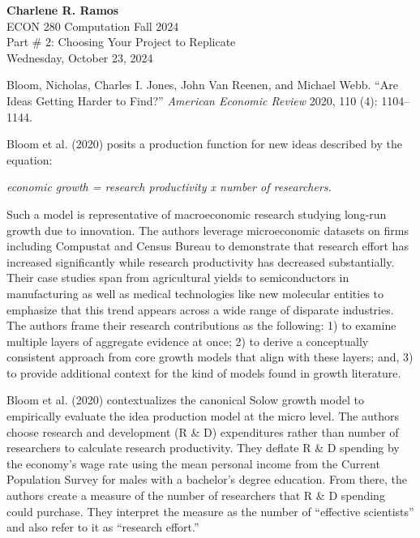 \documentclass[11pt]{amsart}
\begin{document}
\noindent
{\textbf{\color{blue}Charlene R. Ramos}}\\
ECON 280 Computation Fall 2024\\
Part \# 2: Choosing Your Project to Replicate\\
Wednesday, October 23, 2024\\

\smallskip 

\noindent Bloom, Nicholas, Charles I. Jones, John Van Reenen, and Michael Webb. ``Are Ideas Getting Harder to Find?'' \emph{American Economic Review} 2020, 110 (4): 1104–1144.\\ 


\smallskip

\noindent Bloom et al. (2020) posits a production function for new ideas described by the equation: 

\begin{center}
\emph{economic growth = research productivity x number of researchers.}
\end{center}

\noindent Such a model is representative of macroeconomic research studying long-run growth due to innovation. The authors leverage microeconomic datasets on firms including Compustat and Census Bureau to demonstrate that research effort has increased significantly while research productivity has decreased substantially. Their case studies span from agricultural yields to semiconductors in manufacturing as well as medical technologies like new molecular entities to emphasize that this trend appears across a wide range of disparate industries. The authors frame their research contributions as the following: 1) to examine multiple layers of aggregate evidence at once; 2) to derive a conceptually consistent approach from core growth models that align with these layers; and, 3) to provide additional context for the kind of models found in growth literature. 

\bigskip

\bigskip


\smallskip

\noindent Bloom et al. (2020) contextualizes the canonical Solow growth model to empirically evaluate the idea production model at the micro level. The authors choose research and development (R \& D) expenditures rather than number of researchers to calculate research productivity. They deflate R \& D spending by the economy's wage rate using the mean personal income from the Current Population Survey for males with a bachelor's degree education. From there, the authors create a measure of the number of researchers that R \& D spending could purchase. They interpret the measure as the number of ``effective scientists'' and also refer to it as ``research effort.''  
\end{document}
